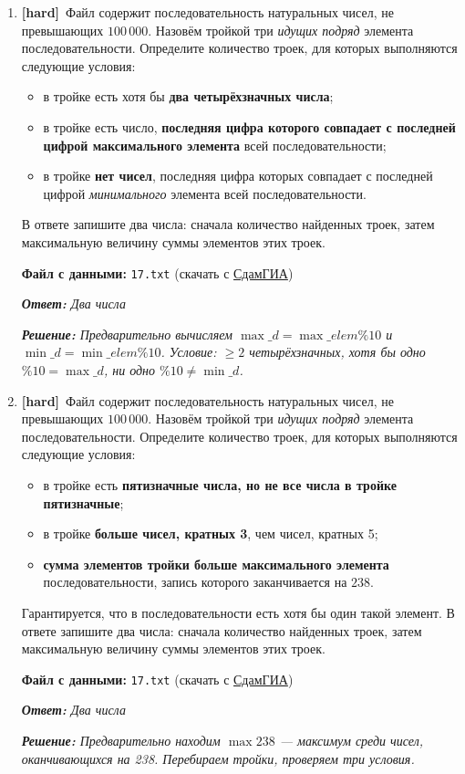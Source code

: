 \documentclass[a4paper]{article}
\newcommand{\hardtag}{\textcolor{hardcolor}{\textbf{[hard]}}}
\newcommand{\answer}[1]{\par\smallskip\textit{\textbf{Ответ:} #1}}
\newcommand{\solution}[1]{\par\textit{\textbf{Решение:} #1}}
\newcommand{\filehint}[1]{\par\smallskip\textbf{Файл с данными:} \texttt{#1} (скачать с \href{https://inf-ege.sdamgia.ru/}{СдамГИА})}
\begin{document}
\begin{enumerate}[label=\textbf{Задача \arabic*.}, leftmargin=*, itemsep=10mm]
  \bigskip

  \item %
  \hardtag\ Файл содержит последовательность натуральных чисел, не превышающих $100\,000$.
  Назовём тройкой три \emph{идущих подряд} элемента последовательности.
  Определите количество троек, для которых выполняются следующие условия:
  \begin{itemize}
    \item в тройке есть хотя бы \textbf{два четырёхзначных числа};
    \item в тройке есть число, \textbf{последняя цифра которого совпадает с
    последней цифрой максимального элемента} всей последовательности;
    \item в тройке \textbf{нет чисел}, последняя цифра которых совпадает с
    последней цифрой \emph{минимального} элемента всей последовательности.
  \end{itemize}
  В ответе запишите два числа: сначала количество найденных троек, затем
  максимальную величину суммы элементов этих троек.
  \filehint{17.txt}
  \answer{Два числа}
  \solution{Предварительно вычисляем $\max\_d = \max\_elem \% 10$ и $\min\_d = \min\_elem \% 10$. Условие: $\geq 2$ четырёхзначных, хотя бы одно $\% 10 = \max\_d$, ни одно $\%10 \neq \min\_d$.}

  \bigskip

  \item %
  \hardtag\ Файл содержит последовательность натуральных чисел, не превышающих $100\,000$.
  Назовём тройкой три \emph{идущих подряд} элемента последовательности.
  Определите количество троек, для которых выполняются следующие условия:
  \begin{itemize}
    \item в тройке есть \textbf{пятизначные числа, но не все числа в тройке
    пятизначные};
    \item в тройке \textbf{больше чисел, кратных 3}, чем чисел, кратных 5;
    \item \textbf{сумма элементов тройки больше максимального элемента}
    последовательности, запись которого заканчивается на $238$.
  \end{itemize}
  Гарантируется, что в последовательности есть хотя бы один такой элемент.
  В ответе запишите два числа: сначала количество найденных троек, затем
  максимальную величину суммы элементов этих троек.
  \filehint{17.txt}
  \answer{Два числа}
  \solution{Предварительно находим $\max238$ — максимум среди чисел, оканчивающихся на 238. Перебираем тройки, проверяем три условия.}


\end{enumerate}
\end{document}

